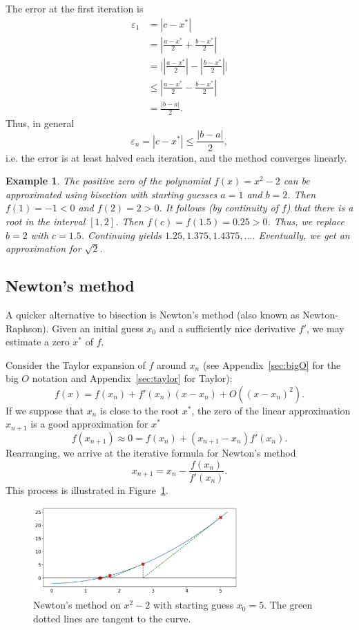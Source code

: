 \documentclass[11pt, a4paper]{article}
\renewcommand{\epsilon}{\varepsilon}
\theoremstyle{break}
\newtheorem{eg}[thm]{Example}
\newcommand*{\Size}[1]{{\left|#1\right|}}%
\begin{document}
The error at the first iteration is \begin{align*}
\epsilon_1 &= |c - x^*| \\&= \Size{\frac{a-x^*}{2}+\frac{b-x^*}{2}}\\&= \Bigg|\Size{\frac{a-x^*}{2}}-\Size{\frac{b-x^*}{2}}\Bigg| \\&\leq \Size{\frac{a-x^*}{2}-\frac{b-x^*}{2}}\\
&= \frac{|b-a|}{2}.\end{align*}
Thus, in general \[\epsilon_n = |c-x^*| \leq \frac{|b-a|}{2},\] i.e. the error is at least halved each iteration, and the method converges linearly.
\begin{eg}
The positive zero of the polynomial $f(x)=x^2-2$ can be approximated using bisection with starting guesses $a=1$ and $b=2$. Then $f(1)=-1<0$ and $f(2)=2>0$. It follows (by continuity of $f$) that there is a root in the interval $[1,2]$. Then $f(c)=f(1.5)=0.25>0$. Thus, we replace $b=2$ with $c=1.5$. Continuing yields $1.25, 1.375, 1.4375, \ldots$. Eventually, we get an approximation for  $\sqrt 2$.
\end{eg}

\subsection{Newton's method}
A quicker alternative to bisection is Newton's method (also known as Newton-Raphson). Given an initial guess $x_0$ and a sufficiently nice derivative $f'$, we may estimate a zero $x^*$ of $f$.

Consider the Taylor expansion of $f$ around $x_n$ (see Appendix~\ref{sec:bigO} for the big $O$ notation and Appendix~\ref{sec:taylor} for Taylor): \[f(x)=f(x_n)+f'(x_n)(x-x_n)+O((x-x_n)^2).\] If we suppose that $x_n$ is close to the root $x^*$, the zero of the linear approximation $x_{n+1}$ is a good approximation for $x^*$ \[f(x_{n+1})\approx 0=f(x_n)+(x_{n+1}-x_n)f'(x_n).\] Rearranging, we arrive at the iterative formula for Newton's method \begin{equation}\label{eq:newtonStep} x_{n+1} = x_n-\frac{f(x_n)}{f'(x_n)}.\end{equation} This process is illustrated in Figure~\ref{fig:newton}.

\begin{figure}\centering
	\includegraphics[width=0.7\textwidth]{Newton}
	\caption{Newton's method on $x^2-2$ with starting guess $x_0=5$. The green dotted lines are tangent to the curve.}\label{fig:newton}
\end{figure}
\end{document}
